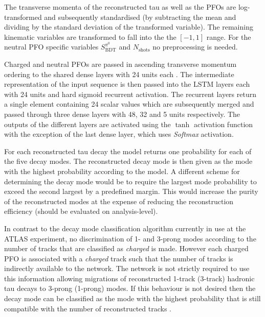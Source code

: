 The transverse momenta of the reconstructed tau as
well as the PFOs are log-transformed and subsequently standardised (by
subtracting the mean and dividing by the standard deviation of the transformed
variable). The remaining kinematic variables are transformed to fall into the
the $[-1, 1]$ range. For the neutral PFO specific variables
$S_\text{BDT}^{\pi^0}$ and $N_\text{shots}$ no preprocessing is needed.

Charged and neutral PFOs are passed in ascending transverse momentum ordering to
the shared dense layers with 24 units each . The
intermediate representation of the input sequence is then passed into the LSTM
layers each with 24 units and hard sigmoid recurrent activation. The recurrent
layers return a single element containing 24 scalar values which are
subsequently merged and passed through three dense layers with 48, 32 and 5
units respectively. The outputs of the different layers are activated using the
$\tanh$ activation function with the exception of the last dense layer, which
uses \emph{Softmax} activation.

For each reconstructed tau decay the model returns one probability for each of
the five decay modes. The reconstructed decay mode is then given as the mode
with the highest probability according to the model. A different scheme for
determining the decay mode would be to require the largest mode probability to
exceed the second largest by a predefined margin. This would increase the purity
of the reconstructed modes at the expense of reducing the reconstruction
efficiency (should be evaluated on analysis-level).

In contrast to the decay mode classification algorithm currently in use at the
ATLAS experiment, no discrimination of 1- and 3-prong modes according to the
number of tracks that are classified as \emph{charged} is made. However each
charged PFO is associated with a \emph{charged} track such that the number of
tracks is indirectly available to the network. The network is not strictly
required to use this information allowing migrations of reconstructed 1-track
(3-track) hadronic tau decays to 3-prong (1-prong) modes. If this behaviour is
not desired then the decay mode can be classified as the mode with the highest
probability that is still compatible with the number of reconstructed tracks
.

